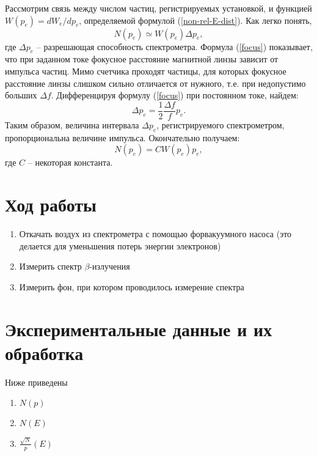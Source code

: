 \documentclass[12pt,a4paper]{article}
\begin{document}
Рассмотрим связь между числом частиц, регистрируемых установкой, и функцией $W(p_e) = dW_e/dp_e$, определяемой формулой (\ref{non-rel-E-dist}). Как легко понять, 
\begin{equation}
N(p_e) \simeq W(p_e) \Delta p_e,
\end{equation}
где $\Delta p_e$ -- разрешающая способность спектрометра. Формула (\ref{focus}) показывает, что при заданном токе фокусное расстояние магнитной линзы зависит от импульса частиц. Мимо счетчика проходят частицы, для которых фокусное расстояние линзы слишком сильно отличается от нужного, т.е. при недопустимо больших $\Delta f$. Дифференцируя формулу (\ref{focus}) при постоянном токе, найдем:
\begin{equation}
\Delta p_e = \frac{1}{2} \frac{\Delta f}{f} p_e.
\end{equation}
Таким образом, величина интервала $\Delta p_e$, регистрируемого спектрометром, пропорциональна величине импульса. Окончательно получаем:
\begin{equation}
N(p_e) = C W(p_e) p_e, 
\end{equation}
где $C$ -- некоторая константа.

\section{Ход работы}

\begin{enumerate}
\item Откачать воздух из спектрометра с помощью форвакуумного насоса (это делается для уменьшения потерь энергии электронов)

\item Измерить спектр $\beta$-излучения

\item Измерить фон, при котором проводилось измерение спектра

\end{enumerate}
\section{Экспериментальные данные и их обработка}

Ниже приведены
\begin{enumerate}
\item $N(p)$
\item $N(E)$
\item $\frac{\sqrt{N}}{p} (E)$
\end{enumerate}
\end{document}
